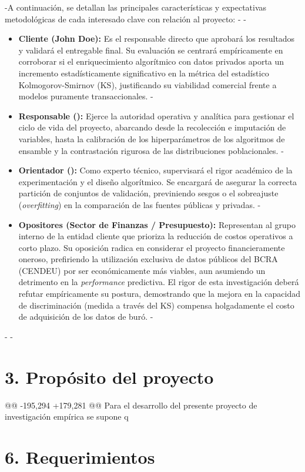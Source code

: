 \documentclass[
 11pt, %
-%
+codirector, %
 ]{charter}
\begin{document}
\begin{table}[ht]
\begin{table}[ht]
-A continuación, se detallan las principales características y expectativas metodológicas de cada interesado clave con relación al proyecto:
-
-\begin{itemize}
-\item \textbf{Cliente (John Doe):} Es el responsable directo que aprobará los resultados y validará el entregable final. Su evaluación se centrará empíricamente en corroborar si el enriquecimiento algorítmico con datos privados aporta un incremento estadísticamente significativo en la métrica del estadístico Kolmogorov-Smirnov (KS), justificando su viabilidad comercial frente a modelos puramente transaccionales.
-\item \textbf{Responsable (\authorname):} Ejerce la autoridad operativa y analítica para gestionar el ciclo de vida del proyecto, abarcando desde la recolección e imputación de variables, hasta la calibración de los hiperparámetros de los algoritmos de ensamble y la contrastación rigurosa de las distribuciones poblacionales.
-\item \textbf{Orientador (\supname):} Como experto técnico, supervisará el rigor académico de la experimentación y el diseño algorítmico. Se encargará de asegurar la correcta partición de conjuntos de validación, previniendo sesgos o el sobreajuste (\textit{overfitting}) en la comparación de las fuentes públicas y privadas.
-\item \textbf{Opositores (Sector de Finanzas / Presupuesto):} Representan al grupo interno de la entidad cliente que prioriza la reducción de costos operativos a corto plazo. Su oposición radica en considerar el proyecto financieramente oneroso, prefiriendo la utilización exclusiva de datos públicos del BCRA (CENDEU) por ser económicamente más viables, aun asumiendo un detrimento en la \textit{performance} predictiva. El rigor de esta investigación deberá refutar empíricamente su postura, demostrando que la mejora en la capacidad de discriminación (medida a través del KS) compensa holgadamente el costo de adquisición de los datos de buró.
-\end{itemize}
-
-
 \section{3. Propósito del proyecto}
 \label{sec:proposito}
 
@@ -195,294 +179,281 @@ Para el desarrollo del presente proyecto de investigación empírica se supone q
 \section{6. Requerimientos}
 \label{sec:requerimientos}
 

\end{table}
\end{table}
\end{document}

